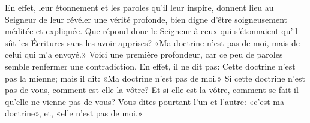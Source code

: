 En effet, leur étonnement et les paroles qu’il leur inspire,
	donnent lieu au Seigneur de leur révéler une vérité profonde,
	bien digne d’être soigneusement méditée et expliquée.
Que répond donc le Seigneur à ceux qui s’étonnaient
	qu’il sût les Écritures sans les avoir apprises?
«Ma doctrine n’est pas de moi, mais de celui qui m’a envoyé.»
Voici une première profondeur,
	car ce peu de paroles semble renfermer une contradiction.
En effet, il ne dit pas: Cette doctrine n’est pas la mienne;
	mais il dit: «Ma doctrine n’est pas de moi.»
Si cette doctrine n’est pas de vous, comment est-elle la vôtre?
	Et si elle est la vôtre, comment se fait-il qu’elle ne vienne pas de vous?
Vous dites pourtant l’un et l’autre:
	«c’est ma doctrine», et, «elle n’est pas de moi.»
